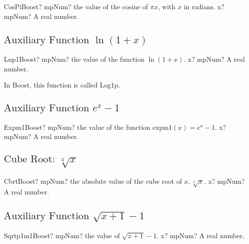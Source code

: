 \begin{mpFunctionsExtract}
	\mpFunctionOne
	{CosPiBoost? mpNum? the value of the cosine of $\pi x$, with $x$ in radians.}
	{x? mpNum? A real number.}
\end{mpFunctionsExtract}


\subsection{\texorpdfstring{$\text{Auxiliary Function }\ln(1+x)$}{lnp1}}

\begin{mpFunctionsExtract}
	\mpFunctionOne
	{Lnp1Boost? mpNum? the value of the function $\ln(1+x)$.}
	{x? mpNum? A real number.}
\end{mpFunctionsExtract}

In Boost, this function is called Log1p.



\subsection{\texorpdfstring{$\text{Auxiliary Function }e^{x}-1$}{expm1}}

\begin{mpFunctionsExtract}
	\mpFunctionOne
	{Expm1Boost? mpNum? the value of the function $\text{expm1}(x) = e^{x}-1$.}
	{x? mpNum? A real number.}
\end{mpFunctionsExtract}



\subsection{\texorpdfstring{$\text{Cube Root: }\sqrt[3]{x}$}{Cbrt}}

\begin{mpFunctionsExtract}
	\mpFunctionOne
	{CbrtBoost? mpNum? the absolute value of the cube root of $x, \sqrt[3]{x}$.}
	{x? mpNum? A real number.}
\end{mpFunctionsExtract}



\subsection{\texorpdfstring{$\text{Auxiliary Function }\sqrt{x+1}-1$}{sqrtp1m1}}

\begin{mpFunctionsExtract}
	\mpFunctionOne
	{Sqrtp1m1Boost? mpNum? the value of $\sqrt{x+1}-1$.}
	{x? mpNum? A real number.}
\end{mpFunctionsExtract}



